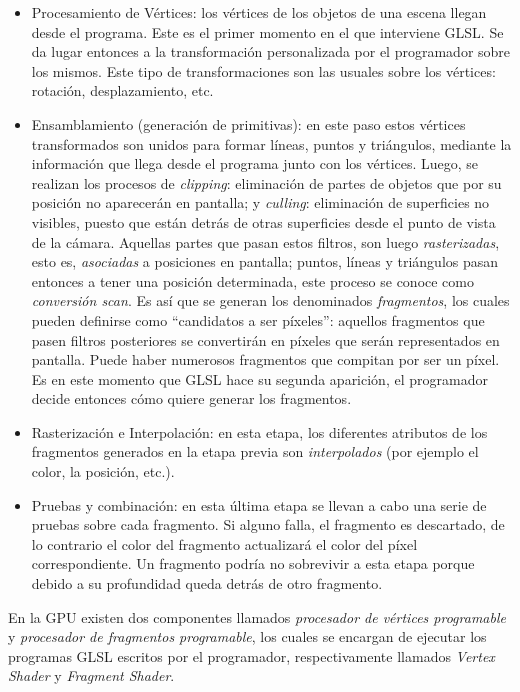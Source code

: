 \begin{itemize}
\item Procesamiento de V\'ertices: los v\'ertices de los objetos de una escena llegan desde el programa. Este es el primer momento en el que interviene GLSL. Se da lugar entonces a la transformaci\'on personalizada por el programador sobre los mismos. Este tipo de transformaciones son las usuales sobre los v\'ertices: rotaci\'on, desplazamiento, etc.
\item Ensamblamiento (generación de primitivas): en este paso estos v\'ertices transformados son unidos para formar l\'ineas, puntos y tri\'angulos, mediante la informaci\'on que llega desde el programa junto con los v\'ertices. Luego, se realizan los procesos de {\em clipping}: eliminaci\'on de partes de objetos que por su posici\'on no aparecer\'an en pantalla; y {\em culling}: eliminaci\'on de superficies no visibles, puesto que est\'an detr\'as de otras superficies desde el punto de vista de la c\'amara. Aquellas partes que pasan estos filtros, son luego {\em rasterizadas}, esto es, {\em asociadas} a posiciones en pantalla; puntos, l\'ineas y tri\'angulos pasan entonces a tener una posici\'on determinada, este proceso se conoce como {\em conversi\'on scan}. Es as\'i que se generan los denominados {\em fragmentos}, los cuales pueden definirse como ``candidatos a ser p\'ixeles'': aquellos fragmentos que pasen filtros posteriores se convertir\'an en p\'ixeles que ser\'an representados en pantalla. Puede haber numerosos fragmentos que compitan por ser un p\'ixel. Es en este momento que GLSL hace su segunda aparici\'on, el programador decide entonces c\'omo quiere generar los fragmentos.
\item Rasterización e Interpolaci\'on: en esta etapa, los diferentes atributos de los fragmentos generados en la etapa previa son {\em interpolados} (por ejemplo el color, la posición, etc.).
\item Pruebas y combinación: en esta \'ultima etapa se llevan a cabo una serie de pruebas sobre cada fragmento. Si alguno falla, el fragmento es descartado, de lo contrario el color del fragmento actualizar\'a el color del p\'ixel correspondiente. Un fragmento podr\'ia no sobrevivir a esta etapa porque debido a su profundidad queda detr\'as de otro fragmento.
\end{itemize}

En la GPU existen dos componentes llamados {\em procesador de v\'ertices programable} y {\em procesador de fragmentos programable}, los cuales se encargan de ejecutar los programas GLSL escritos por el programador, respectivamente llamados {\em Vertex Shader} y {\em Fragment Shader}.

